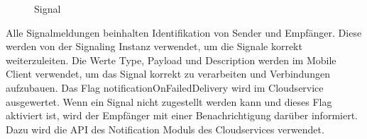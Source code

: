 \begin{figure}[h]
    \centering
    \begin{minipage}[b]{0.33\textwidth}
        \caption{Signal }
    \end{minipage}
\end{figure}

Alle Signalmeldungen beinhalten Identifikation von Sender und Empfänger.
Diese werden von der Signaling Instanz verwendet, um die Signale korrekt weiterzuleiten.
Die Werte Type, Payload und Description werden im Mobile Client verwendet, um das Signal korrekt zu verarbeiten und Verbindungen aufzubauen.
Das Flag notificationOnFailedDelivery wird im Cloudservice ausgewertet.
Wenn ein Signal nicht zugestellt werden kann und dieses Flag aktiviert ist, wird der Empfänger mit einer Benachrichtigung darüber informiert.
Dazu wird die API des Notification Moduls des Cloudservices verwendet.

